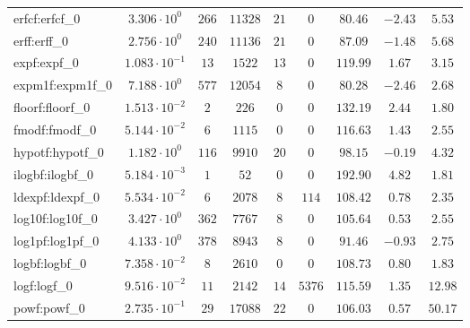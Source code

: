 \begin{tabular}{|l|c|c|c|c|c|c|c|c|}
erfcf:erfcf\_0               & $ 3.306 \cdot 10^{0}  $ & $ 266    $ & $ 11328  $ & $ 21  $ & $ 0    $ & $ 80.46       $ & $ -2.43   $ & $ 5.53    $ \\
erff:erff\_0                 & $ 2.756 \cdot 10^{0}  $ & $ 240    $ & $ 11136  $ & $ 21  $ & $ 0    $ & $ 87.09       $ & $ -1.48   $ & $ 5.68    $ \\
expf:expf\_0                 & $ 1.083 \cdot 10^{-1} $ & $ 13     $ & $ 1522   $ & $ 13  $ & $ 0    $ & $ 119.99      $ & $ 1.67    $ & $ 3.15    $ \\
expm1f:expm1f\_0             & $ 7.188 \cdot 10^{0}  $ & $ 577    $ & $ 12054  $ & $ 8   $ & $ 0    $ & $ 80.28       $ & $ -2.46   $ & $ 2.68    $ \\
floorf:floorf\_0             & $ 1.513 \cdot 10^{-2} $ & $ 2      $ & $ 226    $ & $ 0   $ & $ 0    $ & $ 132.19      $ & $ 2.44    $ & $ 1.80    $ \\
fmodf:fmodf\_0               & $ 5.144 \cdot 10^{-2} $ & $ 6      $ & $ 1115   $ & $ 0   $ & $ 0    $ & $ 116.63      $ & $ 1.43    $ & $ 2.55    $ \\
hypotf:hypotf\_0             & $ 1.182 \cdot 10^{0}  $ & $ 116    $ & $ 9910   $ & $ 20  $ & $ 0    $ & $ 98.15       $ & $ -0.19   $ & $ 4.32    $ \\
ilogbf:ilogbf\_0             & $ 5.184 \cdot 10^{-3} $ & $ 1      $ & $ 52     $ & $ 0   $ & $ 0    $ & $ 192.90      $ & $ 4.82    $ & $ 1.81    $ \\
ldexpf:ldexpf\_0             & $ 5.534 \cdot 10^{-2} $ & $ 6      $ & $ 2078   $ & $ 8   $ & $ 114  $ & $ 108.42      $ & $ 0.78    $ & $ 2.35    $ \\
log10f:log10f\_0             & $ 3.427 \cdot 10^{0}  $ & $ 362    $ & $ 7767   $ & $ 8   $ & $ 0    $ & $ 105.64      $ & $ 0.53    $ & $ 2.55    $ \\
log1pf:log1pf\_0             & $ 4.133 \cdot 10^{0}  $ & $ 378    $ & $ 8943   $ & $ 8   $ & $ 0    $ & $ 91.46       $ & $ -0.93   $ & $ 2.75    $ \\
logbf:logbf\_0               & $ 7.358 \cdot 10^{-2} $ & $ 8      $ & $ 2610   $ & $ 0   $ & $ 0    $ & $ 108.73      $ & $ 0.80    $ & $ 1.83    $ \\
logf:logf\_0                 & $ 9.516 \cdot 10^{-2} $ & $ 11     $ & $ 2142   $ & $ 14  $ & $ 5376 $ & $ 115.59      $ & $ 1.35    $ & $ 12.98   $ \\
powf:powf\_0                 & $ 2.735 \cdot 10^{-1} $ & $ 29     $ & $ 17088  $ & $ 22  $ & $ 0    $ & $ 106.03      $ & $ 0.57    $ & $ 50.17   $ \\

\end{tabular}
